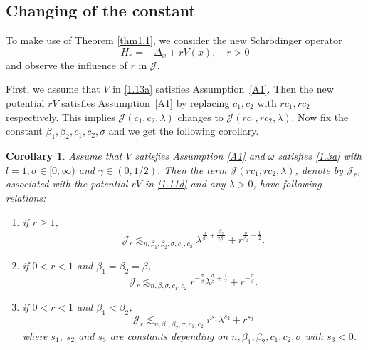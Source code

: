 \documentclass{article}
\numberwithin{equation}{section}
\newtheorem{corollary}[theorem]{Corollary}
\numberwithin{equation}{section}
\theoremstyle{definition}
\begin{document}
\subsection{Changing of the constant}\label{subsec.5}
To make use of Theorem \ref{thm1.1}, we consider the new Schrödinger operator
\begin{equation}\label{1.13a}
	H_r=-\Delta_x+rV(x), \quad r>0
\end{equation}
and observe the influence of $r$ in $\mathcal{J}$. 

First, we assume that $V$ in \eqref{1.13a} satisfies Assumption~\ref{A1}. Then the new potential $rV$ satisfies Assumption~\ref{A1} by replacing  $c_1,c_2$ with $rc_1,rc_2$ respectively. This implies $\mathcal{J}(c_1,c_2,\lambda)$ changes to $\mathcal{J}(rc_1,rc_2,\lambda)$. Now fix the constant $\beta_1,\beta_2,c_1,c_2,\sigma$ and we get the following corollary.
 \begin{corollary}\label{crc1.2}
Assume that $V$ satisfies Assumption \ref{A1} and $\omega$ satisfies \eqref{1.3a} with $l=1,\sigma  \in [0,\infty)$ and $\gamma \in (0,1 /2)$. Then the term $\mathcal{J}(rc_1,rc_2,\lambda)$, denote by $\mathcal{J}_r$, associated with the potential $rV$ in \eqref{1.11d} and any $\lambda>0$, have following relations: 
	 \begin{enumerate}
	 	\item if $r\ge 1$,
\begin{equation}
	\mathcal{J}_r\lesssim_{n,\beta_1,\beta_2,\sigma,c_1,c_2}\lambda^{\frac{\sigma }{\beta_1}+\frac{\beta_2}{2\beta_1}}+r^{\frac{\sigma }{\beta_2}+\frac{1}{2}}.
\end{equation}
		\item if $0<r<1$ and $\beta_1=\beta_2=\beta$, 
\begin{equation}
	\mathcal{J}_r\lesssim_{n,\beta,\sigma ,c_1,c_2}r^{-\frac{\sigma }{\beta}}\lambda^{\frac{\sigma }{\beta}+\frac{1}{2}}+r^{-\frac{\sigma }{\beta}}.
\end{equation}
		\item if $0<r<1$ and $\beta_1<\beta_2$, 
			\begin{equation}
				\mathcal{J}_r\lesssim_{n,\beta_1,\beta_2,\sigma,c_1,c_2} r^{s_1} \lambda^{s_2} +r^{s_3}
			\end{equation}
			where $s_1$, $s_2$ and $s_3$ are constants depending on $n,\beta_1,\beta_2,c_1,c_2,\sigma$ with $s_3<0$.
	 \end{enumerate}
 \end{corollary}
\end{document}
